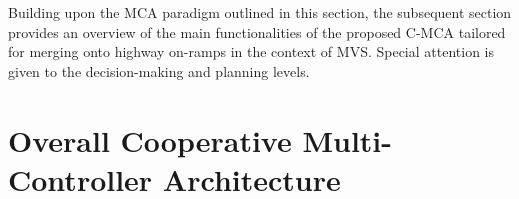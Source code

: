 Building upon the MCA paradigm outlined in this section, the subsequent section provides an overview of the main functionalities of the proposed C-MCA tailored for merging onto highway on-ramps in the context of MVS. Special attention is given to the decision-making and planning levels.
























\section{Overall Cooperative Multi-Controller Architecture} \label{sec: AFRS}



